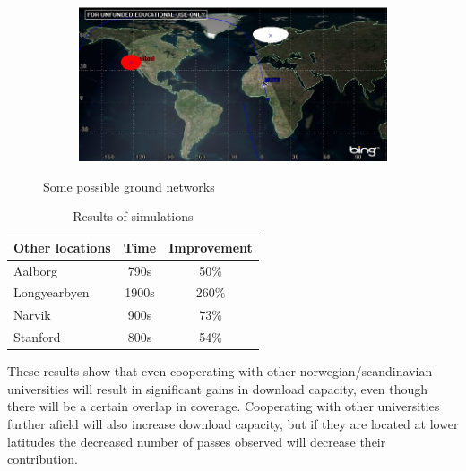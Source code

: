 \begin{figure}
\begin{subfigure}{.5\textwidth}
	\label{fig:range_ntnu_narvik}
\end{subfigure}
\begin{subfigure}{.5\textwidth}
	\centering
	\includegraphics[width=\textwidth]{Figures/range_ntnu_stanford}
	\label{fig:range_ntnu_narvik}
\end{subfigure}
\caption{Some possible ground networks}
\label{fig:ground_networks}
\end{figure}

\begin{table}
	\begin{center}
	\begin{tabular}{l | c c}
  	Other locations & Time & Improvement \\
	\hline \hline
	Aalborg & 790s &  50\% \\
	\hline
	Longyearbyen & 1900s & 260\% \\
	\hline
	Narvik & 900s & 73\%  \\
	\hline
	Stanford & 800s & 54\% 
	\end{tabular}
	\end{center}
	\caption{Results of simulations}
	\label{tab:networks}
\end{table}

These results show that even cooperating with other norwegian/scandinavian universities will result in significant gains in download capacity, even though there will be a certain overlap in coverage. Cooperating with other universities further afield will also increase download capacity, but if they are located at lower latitudes the decreased number of passes observed will decrease their contribution.  
